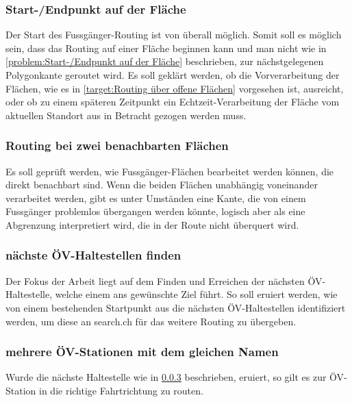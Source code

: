 \subsubsection{Start-/Endpunkt auf der Fläche}
\label{target:Start-/Endpunkt auf der Fläche}
Der Start des Fussgänger-Routing ist von überall möglich. Somit soll es möglich sein, dass das Routing auf einer Fläche beginnen kann und man nicht wie in \ref{problem:Start-/Endpunkt auf der Fläche} beschrieben, zur nächstgelegenen Polygonkante geroutet wird. Es soll geklärt werden, ob die Vorverarbeitung der Flächen, wie es in \ref{target:Routing über offene Flächen} vorgesehen ist, ausreicht, oder ob zu einem späteren Zeitpunkt ein Echtzeit-Verarbeitung der Fläche vom aktuellen Standort aus in Betracht gezogen werden muss.

\subsubsection{Routing bei zwei benachbarten Flächen}
\label{target:Routing bei zwei benachbarten Flächen}

Es soll geprüft werden, wie Fussgänger-Flächen bearbeitet werden können, die direkt benachbart sind. Wenn die beiden Flächen unabhängig voneinander verarbeitet werden, gibt es unter Umständen eine Kante, die von einem Fussgänger problemlos übergangen werden könnte, logisch aber als eine Abgrenzung interpretiert wird, die in der Route nicht überquert wird.

\subsubsection{nächste ÖV-Haltestellen finden}
\label{target:nächste ÖV-Haltestellen finden}
Der Fokus der Arbeit liegt auf dem Finden und Erreichen der nächsten ÖV-Haltestelle, welche einem ans gewünschte Ziel führt. So soll eruiert werden, wie von einem bestehenden Startpunkt aus die nächsten ÖV-Haltestellen identifiziert werden, um diese an search.ch für das weitere Routing zu übergeben.

\subsubsection{mehrere ÖV-Stationen mit dem gleichen Namen}
\label{target:mehrere ÖV-Stationen mit dem gleichen Namen}
Wurde die nächste Haltestelle wie in \ref{target:nächste ÖV-Haltestellen finden} beschrieben, eruiert, so gilt es zur ÖV-Station in die richtige Fahrtrichtung zu routen.


